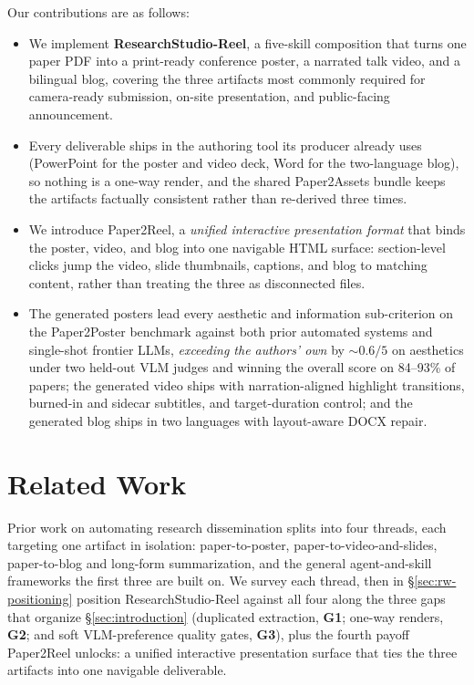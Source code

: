 \documentclass{article}
\begin{document}
Our contributions are as follows:
\begingroup
\setlength{\leftmargini}{1.2em}
\setlength{\topsep}{1.2pt}
\setlength{\partopsep}{0pt}
\setlength{\parskip}{0pt}
\begin{itemize}\itemsep=1.2pt\parsep=0pt
  \item We implement \textbf{ResearchStudio-Reel}, a five-skill composition that turns one paper PDF into a print-ready conference poster, a narrated talk video, and a bilingual blog, covering the three artifacts most commonly required for camera-ready submission, on-site presentation, and public-facing announcement.
  \item Every deliverable ships in the authoring tool its producer already uses (PowerPoint for the poster and video deck, Word for the two-language blog), so nothing is a one-way render, and the shared Paper2Assets bundle keeps the artifacts factually consistent rather than re-derived three times.
  \item We introduce Paper2Reel, a \emph{unified interactive presentation format} that binds the poster, video, and blog into one navigable HTML surface: section-level clicks jump the video, slide thumbnails, captions, and blog to matching content, rather than treating the three as disconnected files.
  \item The generated posters lead every aesthetic and information sub-criterion on the Paper2Poster benchmark against both prior automated systems and single-shot frontier LLMs, \emph{exceeding the authors' own} by ${\sim}0.6/5$ on aesthetics under two held-out VLM judges and winning the overall score on 84--93\% of papers; the generated video ships with narration-aligned highlight transitions, burned-in and sidecar subtitles, and target-duration control; and the generated blog ships in two languages with layout-aware DOCX repair.
\end{itemize}
\endgroup

\section{Related Work}\label{sec:related}

Prior work on automating research dissemination splits into four threads, each targeting one artifact in isolation: paper-to-poster, paper-to-video-and-slides, paper-to-blog and long-form summarization, and the general agent-and-skill frameworks the first three are built on. We survey each thread, then in \S\ref{sec:rw-positioning} position ResearchStudio-Reel against all four along the three gaps that organize \S\ref{sec:introduction} (duplicated extraction, \textbf{G1}; one-way renders, \textbf{G2}; and soft VLM-preference quality gates, \textbf{G3}), plus the fourth payoff Paper2Reel unlocks: a unified interactive presentation surface that ties the three artifacts into one navigable deliverable.
\end{document}
